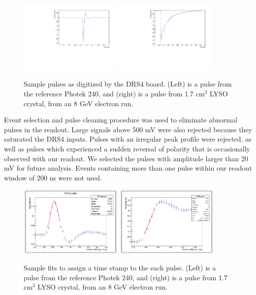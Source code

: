\documentclass[12pt]{article}
\begin{document}
\begin{figure}[h] \centering
\includegraphics[width=0.45\textwidth]{figs/RefPulse} 
\includegraphics[width=0.45\textwidth]{figs/ScintPulse} 
\caption{Sample pulses as digitized by the DRS4 board. (Left) is a  pulse from the reference Photek 240, and (right) is a  pulse from 1.7 cm$^3$ LYSO crystal, from an 8 GeV electron run.} 
\label{fig:PulseShapes}
\end{figure}

Event selection and pulse cleaning procedure was used to eliminate abnormal
pulses in the readout. Large signals above 500 mV were also rejected because
they saturated the DRS4 inputs. Pulses with an irregular peak profile were
rejected, as well as pulses which experienced a sudden reversal of polarity that
is occasionally observed with our readout. We selected the pulses with amplitude
larger than 20 mV for future analysis. Events containing more than one pulse
within our readout window of 200 ns were not used. 

\begin{figure}[h] \centering
\includegraphics[width=0.45\textwidth]{figs/RefPulseFit} 
\includegraphics[width=0.45\textwidth]{figs/ScintPulseFit} 
\caption{Sample fits to assign a time stamp to the each pulse. (Left) is a  pulse from the reference Photek 240, and (right) is a  pulse from 1.7 cm$^3$ LYSO crystal, from an 8 GeV electron run.} 
\label{fig:PulseFits}
\end{figure}
\end{document}
